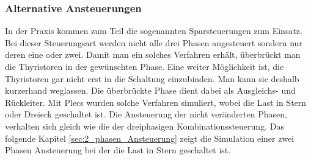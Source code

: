 \subsubsection{Alternative Ansteuerungen}
In der Praxis kommen zum Teil die sogenannten Sparsteuerungen zum Einsatz. Bei dieser Steuerungsart werden nicht alle drei Phasen angesteuert sondern nur deren eine oder zwei. Damit man ein solches Verfahren erhält, überbrückt man die Thyristoren in der gewünschten Phase. Eine weiter Möglichkeit ist, die Thyristoren gar nicht erst in die Schaltung einzubinden. Man kann sie deshalb kurzerhand weglassen. Die überbrückte Phase dient dabei als Ausgleichs- und Rückleiter. Mit Plecs wurden solche Verfahren simuliert, wobei die Last in Stern oder Dreieck geschaltet ist. Die Ansteuerung der nicht veränderten Phasen, verhalten sich gleich wie die der dreiphasigen Kombinationssteuerung. Das folgende Kapitel \ref{sec:2_phasen_Ansteuerung} zeigt die Simulation einer zwei Phasen Ansteuerung bei der die Last in Stern geschaltet ist. 



